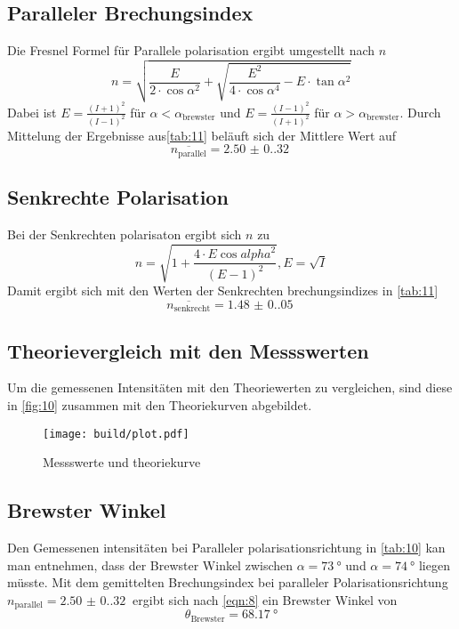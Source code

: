 \subsection{Paralleler Brechungsindex}
\label{sec:10}
Die Fresnel Formel für Parallele polarisation ergibt umgestellt nach $n$
\begin{equation}
n = \sqrt{\frac{E}{2\cdot\cos{\alpha}^2} + \sqrt{\frac{E^2}{4\cdot\cos{\alpha}^4} - E \cdot \tan{\alpha}^2}}
\end{equation}
Dabei ist $E = \frac{(I+1)^2}{(I - 1)^2}$ für $\alpha < \alpha_\text{brewster}$ und  
$E = \frac{(I-1)^2}{(I + 1)^2}$ für $\alpha > \alpha_\text{brewster}$. 
Durch Mittelung der Ergebnisse aus\autoref{tab:11} beläuft sich der Mittlere Wert auf 
\begin{equation}
  \overline{n_\text{parallel}} = \qty{2.50(0.32)}{}
\end{equation}

\subsection{Senkrechte Polarisation}
\label{sec:11}
Bei der Senkrechten polarisaton ergibt sich $n$ zu
\begin{equation}
n = \sqrt{1+\frac{4\cdot E \cos{alpha}^2}{(E-1)^2}}  , E = \sqrt{I}
\end{equation}
Damit ergibt sich mit den Werten der Senkrechten brechungsindizes in \autoref{tab:11} 
\begin{equation}
 \overline{n_\text{senkrecht}} = \qty{1.48(0.05)}{}
\end{equation}
\subsection{Theorievergleich mit den Messswerten}
Um die gemessenen Intensitäten mit den Theoriewerten zu vergleichen, sind 
diese in \autoref{fig:10} zusammen mit den Theoriekurven abgebildet. 
\begin{figure}[H]
  \centering 
  \caption{Messswerte und theoriekurve}
  \label{fig:10}
  \texttt{[image: build/plot.pdf]}
\end{figure}
\subsection{Brewster Winkel}
Den Gemessenen intensitäten bei Paralleler polarisationsrichtung in \autoref{tab:10} kan man entnehmen, dass 
der Brewster Winkel zwischen $\alpha = \qty{73}{\degree}$ und $\alpha = \qty{74}{\degree}$ liegen müsste. Mit dem 
gemittelten Brechungsindex bei paralleler Polarisationsrichtung $n_\text{parallel} = \qty{2.50(0.32)}{}$ ergibt sich nach \autoref{eqn:8}
ein Brewster Winkel von
\begin{equation}
 \theta_\text{Brewster} = \qty{68.17}{\degree}
\end{equation}

